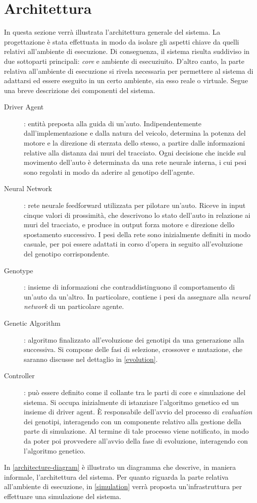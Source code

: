\documentclass[a4paper,12pt]{article}
\begin{document}
\section{Architettura} \label{architecture}
In questa sezione verrà illustrata l'architettura generale del sistema. La progettazione è stata effettuata in modo da isolare gli aspetti chiave da quelli relativi all'ambiente di esecuzione. Di conseguenza, il sistema risulta suddiviso in due sottoparti principali: \emph{core} e ambiente di esecuziuito. D'altro canto, la parte relativa all'ambiente di esecuzione si rivela necessaria per permettere al sistema di adattarsi ed essere eseguito in un certo ambiente, sia esso reale o virtuale. Segue una breve descrizione dei componenti del sistema.
\begin{description}
	\item[Driver Agent]: entità preposta alla guida di un'auto. Indipendentemente dall'implementazione e dalla natura del veicolo, determina la potenza del motore e la direzione di sterzata dello stesso, a partire dalle informazioni relative alla distanza dai muri del tracciato. Ogni decisione che incide sul movimento dell'auto è determinata da una rete neurale interna, i cui pesi sono regolati in modo da aderire al genotipo dell'agente.
	\item[Neural Network]: rete neurale feedforward utilizzata per pilotare un'auto. Riceve in input cinque valori di prossimità, che descrivono lo stato dell'auto in relazione ai muri del tracciato, e produce in output forza motore e direzione dello spostamento successivo. I pesi della rete sono inizialmente definiti in modo casuale, per poi essere adattati in corso d'opera in seguito all'evoluzione del genotipo corrispondente.
	\item[Genotype]: insieme di informazioni che contraddistinguono il comportamento di un'auto da un'altro. In particolare, contiene i pesi da assegnare alla \emph{neural network} di un particolare agente.
	\item[Genetic Algorithm]: algoritmo finalizzato all'evoluzione dei genotipi da una generazione alla successiva. Si compone delle fasi di selezione, crossover e mutazione, che saranno discusse nel dettaglio in \autoref{evolution}.
	\item[Controller]: può essere definito come il collante tra le parti di core e simulazione del sistema. Si occupa inizialmente di istanziare l'algoritmo genetico ed un insieme di driver agent. È responsabile dell'avvio del processo di \emph{evaluation} dei genotipi, interagendo con un componente relativo alla gestione della parte di simulazione. Al termine di tale processo viene notificato, in modo da poter poi provvedere all'avvio della fase di evoluzione, interagendo con l'algoritmo genetico.
\end{description}
In \autoref{architecture-diagram} è illustrato un diagramma che descrive, in maniera informale, l'architettura del sistema. Per quanto riguarda la parte relativa all'ambiente di esecuzione, in \autoref{simulation} verrà proposta un'infrastruttura per effettuare una simulazione del sistema.
\end{document}
